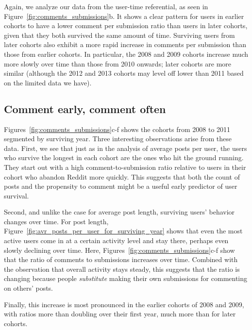 Again, we analyze our data from the user-time referential, as seen in Figure~\ref{fig:comments_submissions}b. It shows a clear pattern for users in earlier cohorts to have a lower comment per submission ratio than users in later cohorts, given that they both survived the same amount of time.  Surviving users from later cohorts also exhibit a more rapid increase in comments per submission than those from earlier cohorts.  In particular, the 2008 and 2009 cohorts increase much more slowly over time than those from 2010 onwards; later cohorts are more similar (although the 2012 and 2013 cohorts may level off lower than 2011 based on the limited data we have). 

\vfill\eject
\subsection{Comment early, comment often}

Figures~\ref{fig:comments_submissions}c-f shows the cohorts from 2008 to 2011 segmented by surviving year.  Three interesting observations arise from these data.  First, we see that just as in the analysis of average posts per user, the users who survive the longest in each cohort are the ones who hit the ground running.  They start out with a high comment-to-submission ratio relative to users in their cohort who abandon Reddit more quickly.  This suggests that both the count of posts and the propensity to comment might be a useful early predictor of user survival.

Second, and unlike the case for average post length, surviving users' behavior changes over time.  For post length, Figure~\ref{fig:avr_posts_per_user_for_surviving_year} shows that even the most active users come in at a certain activity level and stay there, perhaps even slowly declining over time.  Here, Figures~\ref{fig:comments_submissions}c-f show that the ratio of comments to submissions increases over time.  Combined with the observation that overall activity stays steady, this suggests that the ratio is changing because people \textit{substitute} making their own submissions for commenting on others' posts.

Finally, this increase is most pronounced in the earlier cohorts of 2008 and 2009, with ratios more than doubling over their first year, much more than for later cohorts.
